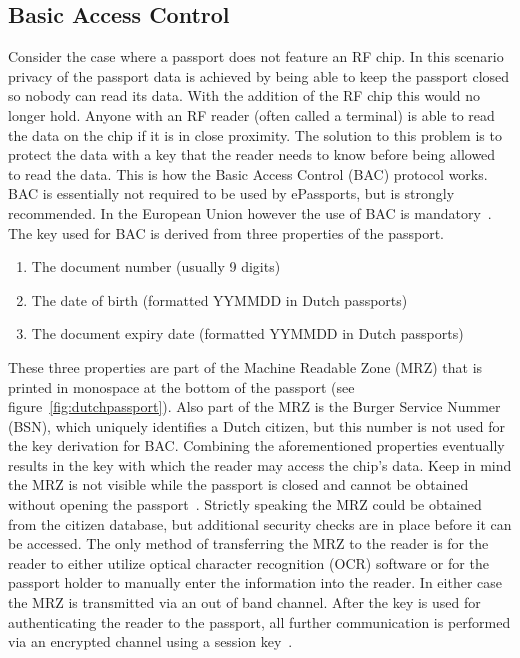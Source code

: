 \subsection{Basic Access Control}
Consider the case where a passport does not feature an RF chip. In this scenario privacy of the passport data is achieved by being able to keep the passport closed so nobody can read its data. With the addition of the RF chip this would no longer hold. Anyone with an RF reader (often called a terminal) is able to read the data on the chip if it is in close proximity. The solution to this problem is to protect the data with a key that the reader needs to know before being allowed to read the data. This is how the Basic Access Control (BAC) protocol works. BAC is essentially not required to be used by ePassports, but is strongly recommended. In the European Union however the use of BAC is mandatory~\cite{icao}. The key used for BAC is derived from three properties of the passport.
\begin{enumerate}
	\item The document number (usually 9 digits)
  \item The date of birth (formatted YYMMDD in Dutch passports)
  \item The document expiry date (formatted YYMMDD in Dutch passports)
\end{enumerate}
These three properties are part of the Machine Readable Zone (MRZ) that is printed in monospace at the bottom of the passport (see figure~\ref{fig:dutchpassport}). Also part of the MRZ is the Burger Service Nummer (BSN), which uniquely identifies a Dutch citizen, but this number is not used for the key derivation for BAC. Combining the aforementioned properties eventually results in the key with which the reader may access the chip's data. Keep in mind the MRZ is not visible while the passport is closed and cannot be obtained without opening the passport~\cite{baceacpassports}. Strictly speaking the MRZ could be obtained from the citizen database, but additional security checks are in place before it can be accessed. The only method of transferring the MRZ to the reader is for the reader to either utilize optical character recognition (OCR) software or for the passport holder to manually enter the information into the reader. In either case the MRZ is transmitted via an out of band channel. After the key is used for authenticating the reader to the passport, all further communication is performed via an encrypted channel using a session key~\cite{icao}.

